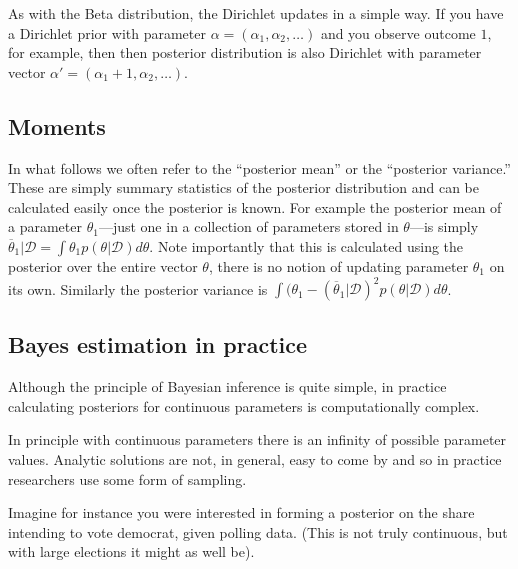 \documentclass[12pt,]{book}
\begin{document}
As with the Beta distribution, the Dirichlet updates in a simple way. If you have a Dirichlet prior with parameter \(\alpha = (\alpha_1, \alpha_2, \dots)\) and you observe outcome \(1\), for example, then then posterior distribution is also Dirichlet with parameter vector \(\alpha' = (\alpha_1+1, \alpha_2,\dots)\).

\hypertarget{moments}{%
\subsection{Moments}\label{moments}}

In what follows we often refer to the ``posterior mean'' or the ``posterior variance.'' These are simply summary statistics of the posterior distribution and can be calculated easily once the posterior is known. For example the posterior mean of a parameter \(\theta_1\)---just one in a collection of parameters stored in \(\theta\)---is simply \(\overline{\theta}_1 | \mathcal{D} = \int \theta_1 p(\theta | \mathcal{D}) d\theta\). Note importantly that this is calculated using the posterior over the entire vector \(\theta\), there is no notion of updating parameter \(\theta_1\) on its own. Similarly the posterior variance is \(\int (\theta_1 - (\overline{\theta}_1 | \mathcal{D})^2 p(\theta | \mathcal{D}) d\theta\).

\hypertarget{bayes-estimation-in-practice}{%
\subsection{Bayes estimation in practice}\label{bayes-estimation-in-practice}}

Although the principle of Bayesian inference is quite simple, in practice calculating posteriors for continuous parameters is computationally complex.

In principle with continuous parameters there is an infinity of possible parameter values. Analytic solutions are not, in general, easy to come by and so in practice researchers use some form of sampling.

Imagine for instance you were interested in forming a posterior on the share intending to vote democrat, given polling data. (This is not truly continuous, but with large elections it might as well be).
\end{document}
